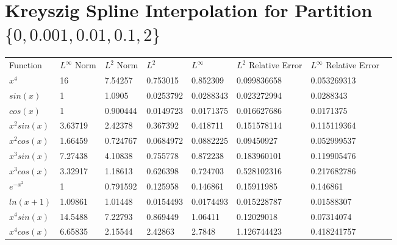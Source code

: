 \section{Kreyszig Spline Interpolation for \newline
Partition $\{0,0.001,0.01,0.1,2\}$}
\tiny{\begin{tabular}{llllllll}
Function        & $L^{\infty}$ Norm & $L^{2}$ Norm & $L^{2}$        & $L^{\infty}$   & $L^{2}$ Relative Error & $L^{\infty}$ Relative Error \\
$x^{4}$       & 16                            & 7.54257                  & 0.753015 & 0.852309 & 0.099836658         & 0.053269313              \\
$sin(x)$      & 1                             & 1.0905                   & 0.0253792 & 0.0288343 & 0.023272994         & 0.0288343              \\
$cos(x)$      & 1                             & 0.900444                 & 0.0149723 & 0.0171375 & 0.016627686         & 0.0171375              \\
$x^{2}sin(x)$ & 3.63719                       & 2.42378                  & 0.367392 & 0.418711 & 0.151578114         & 0.115119364              \\
$x^{2}cos(x)$ & 1.66459                       & 0.724767                 & 0.0684972 & 0.0882225 & 0.09450927        & 0.052999537              \\
$x^{3}sin(x)$ & 7.27438                       & 4.10838                  & 0.755778 & 0.872238 & 0.183960101         & 0.119905476             \\
$x^{3}cos(x)$ & 3.32917                       & 1.18613                  & 0.626398 & 0.724703 & 0.528102316         & 0.217682786              \\
$e^{-x^2}$    & 1                             & 0.791592                 & 0.125958 & 0.146861 & 0.15911985         & 0.146861              \\
$ln(x+1)$     & 1.09861                       & 1.01448                  & 0.0154493 & 0.0174493 & 0.015228787         & 0.01588307              \\
$x^{4}sin(x)$ & 14.5488                       & 7.22793                  & 0.869449 & 1.06411        & 0.12029018        & 0.07314074              \\
$x^{4}cos(x)$ & 6.65835                       & 2.15544                  & 2.42863        & 2.7848         & 1.126744423          & 0.418241757             
\end{tabular}}

